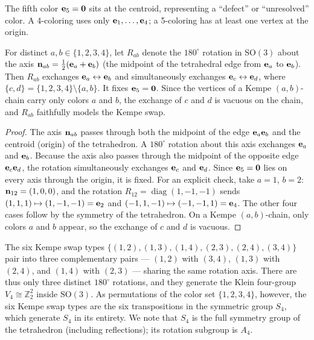 The fifth color $\mathbf{e}_{5} = \mathbf{0}$ sits at the centroid, representing a
``defect'' or ``unresolved'' color. A 4-coloring uses only
$\mathbf{e}_{1}, \ldots, \mathbf{e}_{4}$; a 5-coloring has at least one vertex at the
origin.

\begin{proposition}\label{prop:kempe-rotation}
For distinct $a, b \in \{1,2,3,4\}$, let $R_{ab}$ denote the
$180^\circ$ rotation in $\mathrm{SO}(3)$ about the axis
$\mathbf{n}_{ab} = \frac{1}{2}(\mathbf{e}_{a} + \mathbf{e}_{b})$ (the midpoint of the
tetrahedral edge from $\mathbf{e}_{a}$ to $\mathbf{e}_{b}$). Then $R_{ab}$ exchanges
$\mathbf{e}_{a} \leftrightarrow \mathbf{e}_{b}$ and simultaneously exchanges
$\mathbf{e}_{c} \leftrightarrow \mathbf{e}_{d}$, where
$\{c,d\} = \{1,2,3,4\} \setminus \{a,b\}$. It fixes
$\mathbf{e}_{5} = \mathbf{0}$. Since the vertices of a Kempe $(a,b)$-chain carry
only colors $a$ and $b$, the exchange of $c$ and $d$ is vacuous on the
chain, and $R_{ab}$ faithfully models the Kempe swap.
\end{proposition}

\begin{proof}
The axis $\mathbf{n}_{ab}$ passes through both the midpoint of the
edge $\mathbf{e}_{a}\mathbf{e}_{b}$ and the centroid (origin) of the tetrahedron.
A $180^\circ$ rotation about this axis exchanges $\mathbf{e}_{a}$ and
$\mathbf{e}_{b}$. Because the axis also passes through the midpoint of the
opposite edge $\mathbf{e}_{c}\mathbf{e}_{d}$, the rotation simultaneously exchanges
$\mathbf{e}_{c}$ and $\mathbf{e}_{d}$. Since $\mathbf{e}_{5} = \mathbf{0}$ lies on every axis
through the origin, it is fixed. For an explicit check, take
$a = 1$, $b = 2$: $\mathbf{n}_{12} = (1, 0, 0)$, and the rotation
$R_{12} = \operatorname{diag}(1, -1, -1)$ sends
$(1,1,1) \mapsto (1,-1,-1) = \mathbf{e}_{2}$ and
$(-1,1,-1) \mapsto (-1,-1,1) = \mathbf{e}_{4}$. The other four cases
follow by the symmetry of the tetrahedron. On a Kempe $(a,b)$-chain,
only colors $a$ and $b$ appear, so the exchange of $c$ and $d$ is
vacuous.
\end{proof}

The six Kempe swap types $\{(1,2), (1,3), (1,4), (2,3), (2,4),
(3,4)\}$ pair into three complementary pairs — $(1,2)$ with $(3,4)$,
$(1,3)$ with $(2,4)$, and $(1,4)$ with $(2,3)$ — sharing the same
rotation axis. There are thus only three distinct $180^\circ$
rotations, and they generate the Klein four-group
$V_4 \cong \mathbb{Z}_2^2$ inside $\mathrm{SO}(3)$. As permutations
of the color set $\{1,2,3,4\}$, however, the six Kempe swap types
are the six transpositions in the symmetric group $S_4$, which
generate $S_4$ in its entirety. We note that $S_4$ is the full
symmetry group of the tetrahedron (including reflections); its
rotation subgroup is $A_4$.

